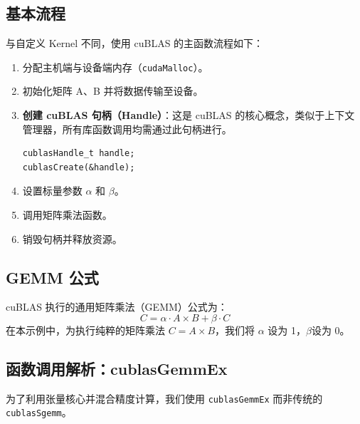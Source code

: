 
\subsection{基本流程}
与自定义 Kernel 不同，使用 cuBLAS 的主函数流程如下：
\begin{enumerate}
    \item 分配主机端与设备端内存（\texttt{cudaMalloc}）。
    \item 初始化矩阵 A、B 并将数据传输至设备。
    \item \textbf{创建 cuBLAS 句柄（Handle）}：这是 cuBLAS 的核心概念，类似于上下文管理器，所有库函数调用均需通过此句柄进行。
    \begin{lstlisting}
cublasHandle_t handle;
cublasCreate(&handle);
    \end{lstlisting}
    \item 设置标量参数 $\alpha$ 和 $\beta$。
    \item 调用矩阵乘法函数。
    \item 销毁句柄并释放资源。
\end{enumerate}


\subsection{GEMM 公式}
cuBLAS 执行的通用矩阵乘法（GEMM）公式为：
\begin{equation}
    C = \alpha \cdot A \times B + \beta \cdot C
\end{equation}
在本示例中，为执行纯粹的矩阵乘法 $C = A \times B$，我们将 $\alpha$ 设为 1，$\beta$设为 0。

\subsection{函数调用解析：cublasGemmEx}
为了利用张量核心并混合精度计算，我们使用 \texttt{cublasGemmEx} 而非传统的\texttt
{cublasSgemm}。

